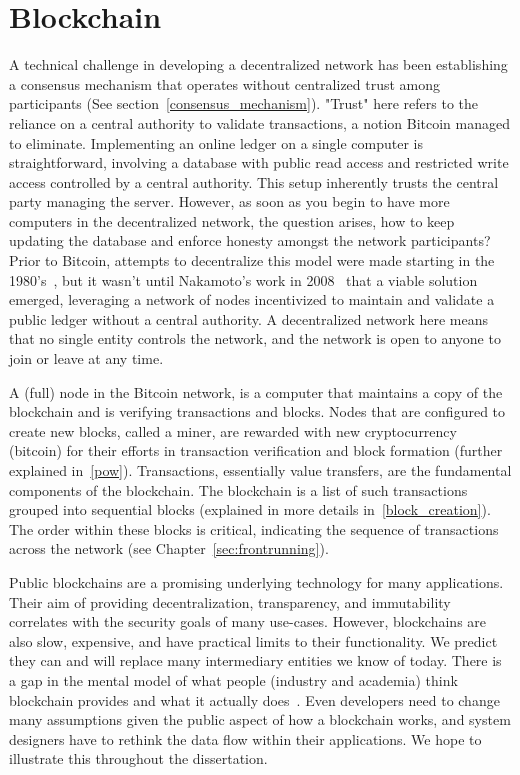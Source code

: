 \section{Blockchain}
A technical challenge in developing a decentralized network has been establishing a consensus mechanism that operates without centralized trust among participants (See section~\ref{consensus_mechanism}). "Trust" here refers to the reliance on a central authority to validate transactions, a notion Bitcoin managed to eliminate. Implementing an online ledger on a single computer is straightforward, involving a database with public read access and restricted write access controlled by a central authority. This setup inherently trusts the central party managing the server. However, as soon as you begin to have more computers in the decentralized network, the question arises, how to keep updating the database and enforce honesty amongst the network participants? Prior to Bitcoin, attempts to decentralize this model were made starting in the 1980's~\cite{narayanan2017bitcoin}, but it wasn't until Nakamoto's work in 2008~\cite{nakamoto2008bitcoin} that a viable solution emerged, leveraging a network of nodes incentivized to maintain and validate a public ledger without a central authority. A decentralized network here means that no single entity controls the network, and the network is open to anyone to join or leave at any time.

A (full) node in the Bitcoin network, is a computer that maintains a copy of the blockchain and is verifying transactions and blocks. Nodes that are configured to create new blocks, called a miner, are rewarded with new cryptocurrency (bitcoin) for their efforts in transaction verification and block formation (further explained in~\ref{pow}). Transactions, essentially value transfers, are the fundamental components of the blockchain. The blockchain is a list of such transactions grouped into sequential blocks (explained in more details in~\ref{block_creation}). The order within these blocks is critical, indicating the sequence of transactions across the network (see Chapter~\ref{sec:frontrunning}). 


Public blockchains are a promising underlying technology for many applications. Their aim of providing decentralization, transparency, and immutability correlates with the security goals of many use-cases. However, blockchains are also slow, expensive, and have practical limits to their functionality. We predict they can and will replace many intermediary entities we know of today. There is a gap in the mental model of what people (industry and academia) think blockchain provides and what it actually does~\cite{RKYCC20}. Even developers need to change many assumptions given the public aspect of how a blockchain works, and system designers have to rethink the data flow within their applications. We hope to illustrate this throughout the dissertation. 



